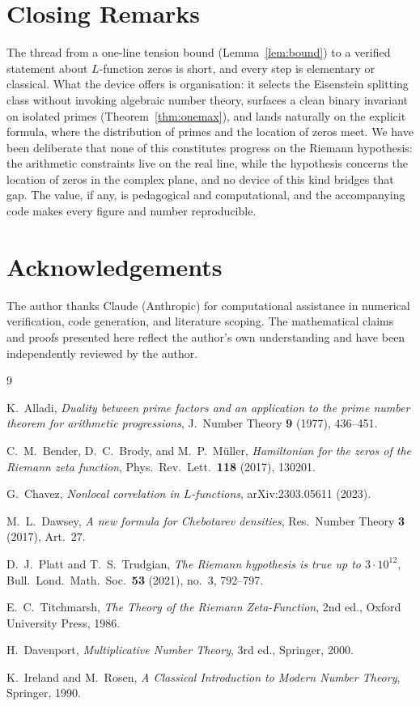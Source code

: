 \documentclass[11pt]{article}
\theoremstyle{plain}
\theoremstyle{definition}
\theoremstyle{remark}
\begin{document}
\section{Closing Remarks}

The thread from a one-line tension bound (Lemma~\ref{lem:bound}) to a verified
statement about $L$-function zeros is short, and every step is elementary or
classical. What the device offers is organisation: it selects the Eisenstein
splitting class without invoking algebraic number theory, surfaces a clean
binary invariant on isolated primes (Theorem~\ref{thm:onemax}), and lands
naturally on the explicit formula, where the distribution of primes and the
location of zeros meet. We have been deliberate that none of this constitutes
progress on the Riemann hypothesis: the arithmetic constraints live on the real
line, while the hypothesis concerns the location of zeros in the complex plane,
and no device of this kind bridges that gap. The value, if any, is pedagogical
and computational, and the accompanying code makes every figure and number
reproducible.

\section*{Acknowledgements}
The author thanks Claude (Anthropic) for computational assistance in numerical
verification, code generation, and literature scoping. The mathematical claims
and proofs presented here reflect the author's own understanding and have been
independently reviewed by the author.

\begin{thebibliography}{9}

K.~Alladi,
\emph{Duality between prime factors and an application to the prime number
theorem for arithmetic progressions},
J.~Number Theory \textbf{9} (1977), 436--451.

C.~M.~Bender, D.~C.~Brody, and M.~P.~M\"uller,
\emph{Hamiltonian for the zeros of the Riemann zeta function},
Phys.\ Rev.\ Lett.\ \textbf{118} (2017), 130201.

G.~Chavez,
\emph{Nonlocal correlation in $L$-functions},
arXiv:2303.05611 (2023).

M.~L.~Dawsey,
\emph{A new formula for Chebotarev densities},
Res.~Number Theory \textbf{3} (2017), Art.~27.

D.~J.~Platt and T.~S.~Trudgian,
\emph{The Riemann hypothesis is true up to $3\cdot10^{12}$},
Bull.~Lond.~Math.~Soc.~\textbf{53} (2021), no.~3, 792--797.

E.~C.~Titchmarsh,
\emph{The Theory of the Riemann Zeta-Function}, 2nd ed.,
Oxford University Press, 1986.

H.~Davenport,
\emph{Multiplicative Number Theory}, 3rd ed.,
Springer, 2000.

K.~Ireland and M.~Rosen,
\emph{A Classical Introduction to Modern Number Theory},
Springer, 1990.

\end{thebibliography}
\end{document}
